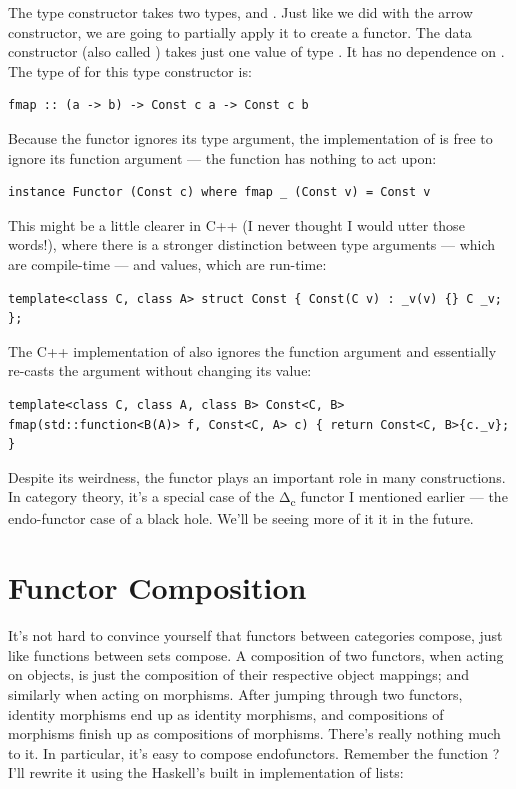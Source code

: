 The  type constructor takes two types,  and
. Just like we did with the arrow constructor, we are going to
partially apply it to create a functor. The data constructor (also
called ) takes just one value of type . It has
no dependence on . The type of  for this type
constructor is:

\begin{verbatim}
fmap :: (a -> b) -> Const c a -> Const c b
\end{verbatim}

Because the functor ignores its type argument, the implementation of
 is free to ignore its function argument --- the function
has nothing to act upon:

\begin{verbatim}
instance Functor (Const c) where fmap _ (Const v) = Const v
\end{verbatim}

This might be a little clearer in C++ (I never thought I would utter
those words!), where there is a stronger distinction between type
arguments --- which are compile-time --- and values, which are run-time:

\begin{verbatim}
template<class C, class A> struct Const { Const(C v) : _v(v) {} C _v; };
\end{verbatim}

The C++ implementation of  also ignores the function
argument and essentially re-casts the  argument without
changing its value:

\begin{verbatim}
template<class C, class A, class B> Const<C, B> fmap(std::function<B(A)> f, Const<C, A> c) { return Const<C, B>{c._v}; }
\end{verbatim}

Despite its weirdness, the  functor plays an important
role in many constructions. In category theory, it's a special case of
the Δ\textsubscript{c} functor I mentioned earlier --- the endo-functor
case of a black hole. We'll be seeing more of it it in the future.

\section{Functor Composition}\label{functor-composition}

It's not hard to convince yourself that functors between categories
compose, just like functions between sets compose. A composition of two
functors, when acting on objects, is just the composition of their
respective object mappings; and similarly when acting on morphisms.
After jumping through two functors, identity morphisms end up as
identity morphisms, and compositions of morphisms finish up as
compositions of morphisms. There's really nothing much to it. In
particular, it's easy to compose endofunctors. Remember the function
? I'll rewrite it using the Haskell's built in
implementation of lists:

